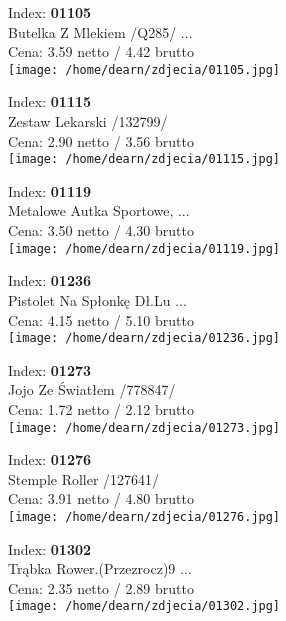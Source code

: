 {Index: \textbf{01105}\\
Butelka Z Mlekiem /Q285/  ...\\
Cena: 3.59 netto / 4.42 brutto\\
  \texttt{[image: /home/dearn/zdjecia/01105.jpg]}}\newline\newline

{Index: \textbf{01115}\\
Zestaw Lekarski /132799/\\
Cena: 2.90 netto / 3.56 brutto\\
  \texttt{[image: /home/dearn/zdjecia/01115.jpg]}}\newline\newline

{Index: \textbf{01119}\\
Metalowe Autka Sportowe,  ...\\
Cena: 3.50 netto / 4.30 brutto\\
  \texttt{[image: /home/dearn/zdjecia/01119.jpg]}}\newline\newline

{Index: \textbf{01236}\\
Pistolet Na Spłonkę Dł.Lu ...\\
Cena: 4.15 netto / 5.10 brutto\\
  \texttt{[image: /home/dearn/zdjecia/01236.jpg]}}\newline\newline

{Index: \textbf{01273}\\
Jojo Ze Światłem /778847/\\
Cena: 1.72 netto / 2.12 brutto\\
  \texttt{[image: /home/dearn/zdjecia/01273.jpg]}}\newline\newline

{Index: \textbf{01276}\\
Stemple Roller /127641/\\
Cena: 3.91 netto / 4.80 brutto\\
  \texttt{[image: /home/dearn/zdjecia/01276.jpg]}}\newline\newline

{Index: \textbf{01302}\\
Trąbka Rower.(Przezrocz)9 ...\\
Cena: 2.35 netto / 2.89 brutto\\
  \texttt{[image: /home/dearn/zdjecia/01302.jpg]}}\newline\newline

